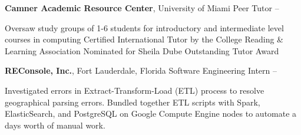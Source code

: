 \documentclass[letterpaper,MMMyyyy,nonstopmode]{simpleresumecv}
\begin{document}
\begin{Body}
\Entry
\textbf{Camner Academic Resource Center}, University of Miami
\Gap
\BulletItem Peer Tutor
\hfill {} -- 
\begin{Detail}
\SubBulletItem Oversaw study groups of 1-6 students for introductory and intermediate level courses in computing
\SubBulletItem Certified International Tutor by the College Reading \& Learning Association
\SubBulletItem Nominated for Sheila Dube Outstanding Tutor Award
\end{Detail}



\Entry
\textbf{REConsole, Inc.}, Fort Lauderdale, Florida
\Gap
\BulletItem
Software Engineering Intern
\hfill
{} -- 
\begin{Detail}
\SubBulletItem
Investigated errors in Extract-Transform-Load (ETL) process to resolve geographical parsing errors.
\SubBulletItem
Bundled together ETL scripts with Spark, ElasticSearch, and PostgreSQL on Google Compute Engine nodes to automate a days worth of manual work.
\end{Detail}

\end{Body}
\end{document}

